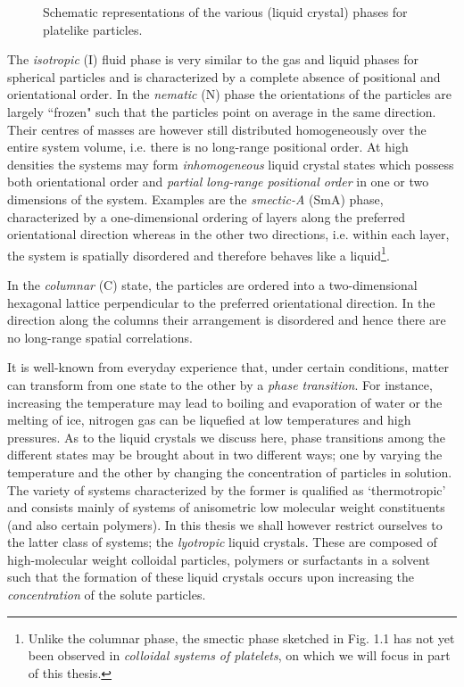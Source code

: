 \documentclass[amssymb]{revtex4}
\begin{document}
\begin{figure}
\caption{Schematic representations of the various  (liquid crystal)
phases for platelike particles.}
\end{figure}

The {\em isotropic} (I) fluid phase is very similar to the gas and liquid phases 
for spherical particles and is characterized by a complete absence of positional and orientational 
order. In the {\em nematic} (N) phase the orientations of the particles are largely ``frozen" such that 
the particles point on average in the same direction. Their centres of masses are however
still distributed homogeneously over the entire system volume, i.e. there is no long-range
positional order. At high densities the systems may form {\em inhomogeneous} liquid crystal 
states which possess both orientational order and {\em partial long-range positional order} in one or two dimensions
of the system. Examples are the {\em smectic-A} (SmA) phase, characterized by  a one-dimensional ordering
of layers along the preferred orientational direction  whereas in the other two directions,
i.e. within each layer,
the system is spatially disordered and therefore behaves like a liquid\footnote{Unlike the columnar phase, the smectic phase sketched  in Fig. 1.1 has not yet been observed in  {\em colloidal systems of platelets}, on which we will focus in part of this thesis. }.

In the {\em columnar} (C) state, the particles are ordered into 
a two-dimensional hexagonal lattice perpendicular to the preferred orientational direction. 
In the direction along the columns
their arrangement is disordered and hence there are no long-range spatial correlations.


It is  well-known from everyday experience that, under certain conditions, matter can transform from one state to the other 
by a {\em phase transition}. For instance, increasing the temperature may lead to
boiling and evaporation of water or the melting of ice, nitrogen gas can be liquefied
at low temperatures and high pressures. 
As to the liquid crystals we discuss here,  phase transitions among the different
states may be brought about
in two different ways; one by varying the temperature  and the other by changing
the concentration of particles in solution. The variety of systems characterized by the former 
is qualified as `thermotropic' and consists mainly of systems of anisometric low molecular weight constituents (and also certain polymers).
In this thesis we shall however restrict ourselves to the latter class of systems; the {\em lyotropic}
liquid crystals. These are composed of high-molecular weight colloidal particles, polymers
or surfactants in a solvent such that the formation of these liquid crystals occurs upon increasing the {\em concentration} of the solute particles.
 
\end{document}
